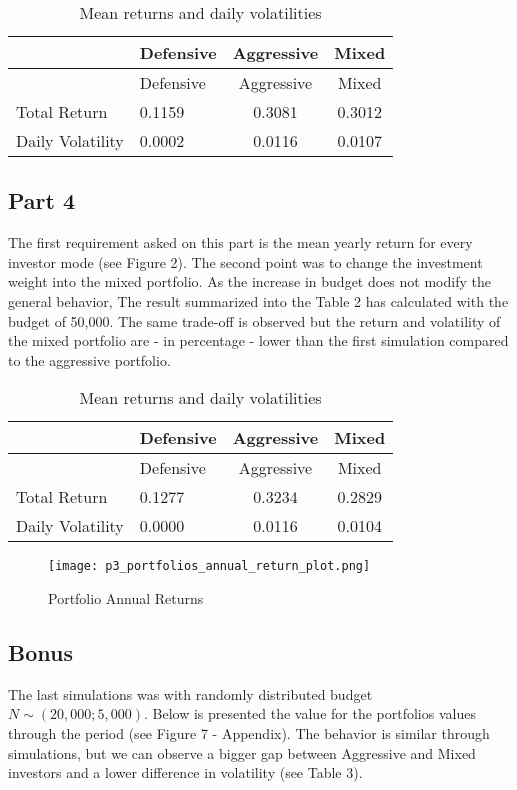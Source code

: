 \documentclass[
  11pt,
]{article}
\begin{document}
\begin{longtable}[]{@{}llcc@{}}
\caption{\label{tab:unnamed-chunk-2}Mean returns and daily volatilities}\tabularnewline
\toprule
& Defensive & Aggressive & Mixed\tabularnewline
\midrule
\endfirsthead
\toprule
& Defensive & Aggressive & Mixed\tabularnewline
\midrule
\endhead
Total Return & 0.1159 & 0.3081 & 0.3012\tabularnewline
Daily Volatility & 0.0002 & 0.0116 & 0.0107\tabularnewline
\bottomrule
\end{longtable}

\hypertarget{part-4}{%
\subsection{Part 4}\label{part-4}}

The first requirement asked on this part is the mean yearly return for every investor mode (see Figure 2). The second point was to change the investment weight into the mixed portfolio. As the increase in budget does not modify the general behavior, The result summarized into the Table 2 has calculated with the budget of 50,000. The same trade-off is observed but the return and volatility of the mixed portfolio are - in percentage - lower than the first simulation compared to the aggressive portfolio.

\begin{longtable}[]{@{}llcc@{}}
\caption{\label{tab:unnamed-chunk-4}Mean returns and daily volatilities}\tabularnewline
\toprule
& Defensive & Aggressive & Mixed\tabularnewline
\midrule
\endfirsthead
\toprule
& Defensive & Aggressive & Mixed\tabularnewline
\midrule
\endhead
Total Return & 0.1277 & 0.3234 & 0.2829\tabularnewline
Daily Volatility & 0.0000 & 0.0116 & 0.0104\tabularnewline
\bottomrule
\end{longtable}

\begin{figure}
\centering
\texttt{[image: p3\_portfolios\_annual\_return\_plot.png]}
\caption{Portfolio Annual Returns}
\end{figure}

\hypertarget{bonus}{%
\subsection{Bonus}\label{bonus}}

The last simulations was with randomly distributed budget \(N\sim(20,000; 5,000)\). Below is presented the value for the portfolios values through the period (see Figure 7 - Appendix). The behavior is similar through simulations, but we can observe a bigger gap between Aggressive and Mixed investors and a lower difference in volatility (see Table 3).
\end{document}

